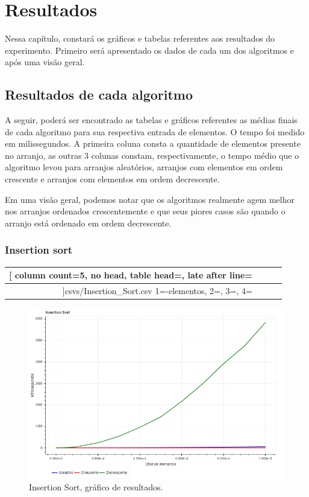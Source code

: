 \chapter{Resultados}
Nessa capítulo, constará os gráficos e tabelas referentes aos resultados do experimento. Primeiro será apresentado os dados de cada um dos algoritmos e após uma visão geral.

\section{Resultados de cada algoritmo}
A seguir, poderá ser encontrado as tabelas e gráficos referentes as médias finais de cada algoritmo para sua respectiva entrada de elementos. O tempo foi medido em milissegundos. A primeira coluna consta a quantidade de elementos presente no arranjo, as outras 3 colunas constam, respectivamente, o tempo médio que o algoritmo levou para arranjos aleatórios, arranjos com elementos em ordem crescente e arranjos com elementos em ordem decrescente.

Em uma visão geral, podemos notar que os algoritmos realmente agem melhor nos arranjos ordenados crescentemente e que seus piores casos são quando o arranjo está ordenado em ordem decrescente.

\subsection{Insertion sort}
\begin{longtable}{|r|c|c|c|}
	\hline
	\csvreader[
		column count=5,
		no head,
		table head=\hline,
		late after line=\\\hline
	]{csvs/Insertion_Sort.csv}{
		1=\n-elementos, 2=\aleatorio, 3=\crescente, 4=\decrescente
	}{ \n-elementos & \aleatorio & \crescente & \decrescente }
	\caption{Média de tempo do Insertion Sort}
	\label{t-insertion}
\end{longtable}

\begin{figure}[H]
	\centering
	\includegraphics[scale=0.6]{img/algoritmos/insertion_sort.png}
	\caption{Insertion Sort, gráfico de resultados.}
	\label{graph-insertion}
\end{figure}

